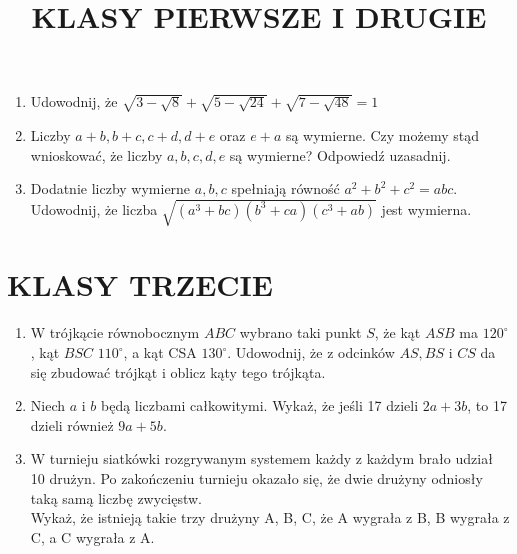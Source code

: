\documentclass[10pt]{article}
\title{KLASY PIERWSZE I DRUGIE }
\author{}
\date{}
\begin{document}
\maketitle
\begin{enumerate}
  \item Udowodnij, że \(\sqrt{3-\sqrt{8}}+\sqrt{5-\sqrt{24}}+\sqrt{7-\sqrt{48}}=1\)
  \item Liczby \(a+b, b+c, c+d, d+e\) oraz \(e+a\) są wymierne. Czy możemy stąd wnioskować, że liczby \(a, b, c, d, e\) są wymierne? Odpowiedź uzasadnij.
  \item Dodatnie liczby wymierne \(a, b, c\) spełniają równość \(a^{2}+b^{2}+c^{2}=a b c\). Udowodnij, że liczba \(\sqrt{\left(a^{3}+b c\right)\left(b^{3}+c a\right)\left(c^{3}+a b\right)}\) jest wymierna.
\end{enumerate}

\section*{KLASY TRZECIE}
\begin{enumerate}
  \item W trójkącie równobocznym \(A B C\) wybrano taki punkt \(S\), że kąt \(A S B\) ma \(120^{\circ}\), kąt \(B S C\) \(110^{\circ}\), a kąt CSA \(130^{\circ}\). Udowodnij, że z odcinków \(A S, B S\) i \(C S\) da się zbudować trójkąt i oblicz kąty tego trójkąta.
  \item Niech \(a\) i \(b\) będą liczbami całkowitymi. Wykaż, że jeśli 17 dzieli \(2 a+3 b\), to 17 dzieli również \(9 a+5 b\).
  \item W turnieju siatkówki rozgrywanym systemem każdy z każdym brało udział 10 drużyn. Po zakończeniu turnieju okazało się, że dwie drużyny odniosły taką samą liczbę zwycięstw.\\
Wykaż, że istnieją takie trzy drużyny A, B, C, że A wygrała z B, B wygrała z C, a C wygrała z A.
\end{enumerate}
\end{document}
